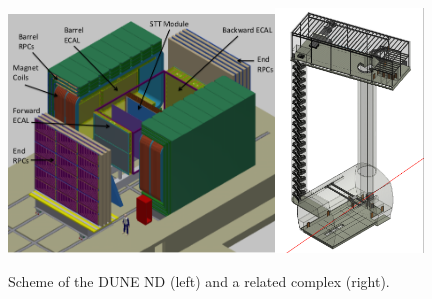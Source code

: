 \begin{figure}
\caption{Scheme of the DUNE ND (left) and a related complex (right).}
\label{fig:nearDetector}
\centering
\includegraphics[width=0.63\textwidth, keepaspectratio=true]{figs/nearDetector.png}\includegraphics[width=0.35\textwidth, keepaspectratio=true]{figs/nearDetector_project.png}
\end{figure}
